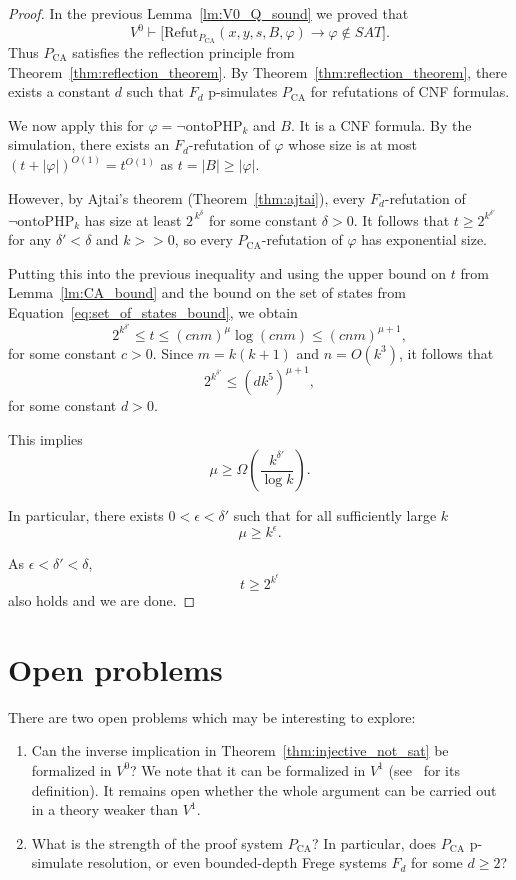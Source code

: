 \documentclass{article}
\theoremstyle{plain}
\theoremstyle{definition}
\begin{document}
\begin{proof}
    
In the previous Lemma~\ref{lm:V0_Q_sound} we proved that
\[
V^0 \vdash
\bigl[\mathrm{Refut}_{P_{\operatorname{CA}}}(x,y,s,B,\varphi)
\rightarrow
\varphi \notin SAT\bigr] .
\]
Thus $P_{\operatorname{CA}}$ satisfies the reflection principle from
Theorem~\ref{thm:reflection_theorem}. By Theorem~\ref{thm:reflection_theorem}, there exists a constant $d$
such that $F_d$ p-simulates $P_{\operatorname{CA}}$ for
refutations of CNF formulas.

We now apply this for $\varphi=\lnot \mathrm{ontoPHP}_k$ and $B$. It is a CNF formula. By the simulation, there exists an $F_d$-refutation of $\varphi$
whose size is at most $(t + |\varphi|)^{O(1)} = t^{O(1)}$ as $t = |B| \geq |\varphi|$.  


However, by Ajtai's theorem (Theorem~\ref{thm:ajtai}), every $F_d$-refutation \linebreak
of $\lnot \mathrm{ontoPHP}_k$ has size at least
$2^{\,k^\delta}$
for some constant $\delta>0$.  It follows that 
$t \geq 2^{k^{\delta'}}$ for any $\delta' < \delta$ and $k >>0$, so every $P_{\operatorname{CA}}$-refutation of $\varphi$ has
exponential size.

Putting this into the previous inequality and using the upper bound on $t$ from Lemma~\ref{lm:CA_bound} and the bound on the set of states from Equation~\eqref{eq:set_of_states_bound}, we obtain
\[
2^{k^{\delta'}} \leq t \leq (c n m)^\mu \log(c n m) \leq  (c n m)^{\mu+1},
\]
for some constant $c>0$. Since $m=k(k+1)$ and $n=O(k^3)$, it follows that
\[
2^{k^{\delta'}} \le (d k^5)^{\mu +1},
\]
for some constant $d>0$.

This implies
\[
\mu \geq \Omega\!\left(\frac{k^{\delta'}}{\log k}\right).
\]

In particular, there exists $0<\epsilon<\delta'$ such that for all sufficiently large $k$
\[
\mu \ge k^{\epsilon} .
\]

As $\epsilon < \delta' < \delta$, 
\[
t \geq 2^{k^\epsilon}
\]
also holds and we are done.
\end{proof}

\section*{Open problems}

There are two open problems which may be interesting to explore:

\begin{enumerate}
\item Can the inverse implication in Theorem~\ref{thm:injective_not_sat} be formalized in $V^0$? 
We note that it can be formalized in $V^1$ (see~\cite{Cook_Nguyen_2010} for its definition). It remains open whether the whole argument can be carried out in a theory weaker than $V^1$.

    \item What is the strength of the proof system $P_\mathrm{CA}$? 
    In particular, does $P_\mathrm{CA}$ p-simulate resolution, or even bounded-depth Frege systems $F_d$ for some $d \geq 2$?
\end{enumerate}
\end{document}

